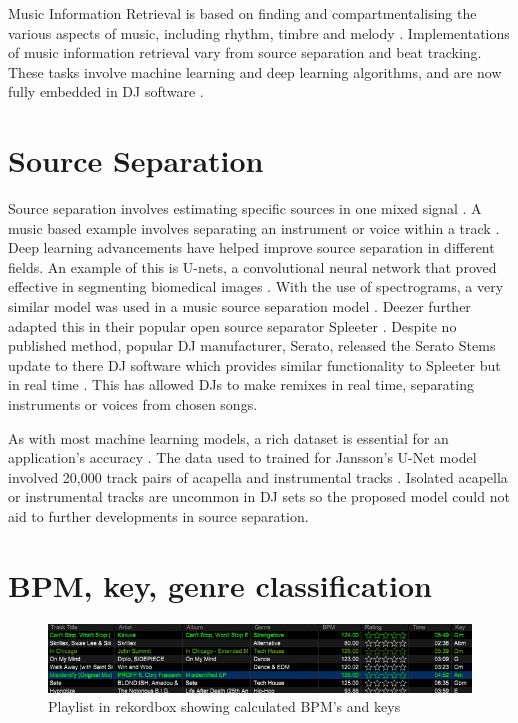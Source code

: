 Music Information Retrieval is based on finding and compartmentalising the various aspects of music, including rhythm, timbre and melody \citep{orio_music_2006}. Implementations of music information retrieval vary from source separation and beat tracking. These tasks involve machine learning and deep learning algorithms, and are now fully embedded in DJ software \citep{rekordbox_rekordbox_2020}. 

\section{Source Separation}

Source separation involves estimating specific sources in one mixed signal \citep{jansson_singing_2017}. A music based example involves separating an instrument or voice within a track \citep{sgouros_efficient_2022}. Deep learning advancements have helped improve source separation in different fields. An example of this is U-nets, a convolutional neural network that proved effective in segmenting biomedical images \citep{ronneberger_u-net_2015}. With the use of spectrograms, a very similar model was used in a music source separation model \citep{jansson_singing_2017}. Deezer  further adapted this in their popular open source separator Spleeter \citep{hennequin_spleeter_2020}. Despite no published method, popular DJ manufacturer, Serato, released the Serato Stems update to there DJ software which provides similar functionality to Spleeter but in real time \citep{kirn_review_2023}. This has allowed DJs to make remixes in real time, separating instruments or voices from chosen songs.

As with most machine learning models, a rich dataset is essential for an application's accuracy \citep{jain_overview_2020}. The data used to trained for Jansson's U-Net model involved 20,000 track pairs of acapella and instrumental tracks \citep{jansson_singing_2017}. Isolated acapella or instrumental tracks are uncommon in DJ sets so the proposed model could not aid to further developments in source separation.


\section{BPM, key, genre classification}

\begin{figure}[H]
	
	\includegraphics[scale=0.64]{images/rekordbox}
	\centering
	\caption{Playlist in rekordbox showing calculated BPM's and keys \citep{rekordbox_rekordbox_2023}} 
\end{figure}


